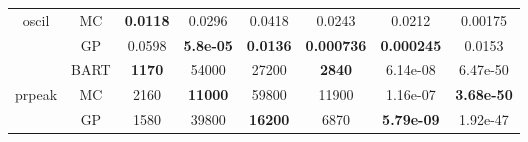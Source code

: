 \begin{table}[t]
\begin{center}
{\begin{tabular}{ c | c | c | c | c | c | c | c }
 oscil  & MC  & \textbf{0.0118}  & 0.0296  & 0.0418  & 0.0243  & 0.0212  & 0.00175 \\
   & GP  & 0.0598  & \textbf{5.8e-05}  & \textbf{0.0136}  & \textbf{0.000736}  & \textbf{0.000245}  & 0.0153 \\
 \hline
   & BART  & \textbf{1170}  & 54000  & 27200  & \textbf{2840}  & 6.14e-08  & 6.47e-50 \\
 prpeak  & MC  & 2160  & \textbf{11000}  & 59800  & 11900  & 1.16e-07  & \textbf{3.68e-50} \\
   & GP  & 1580  & 39800  & \textbf{16200}  & 6870  & \textbf{5.79e-09}  & 1.92e-47 \\
 \hline
\end{tabular}}
\label{table:genz}
\end{center}
\end{table}